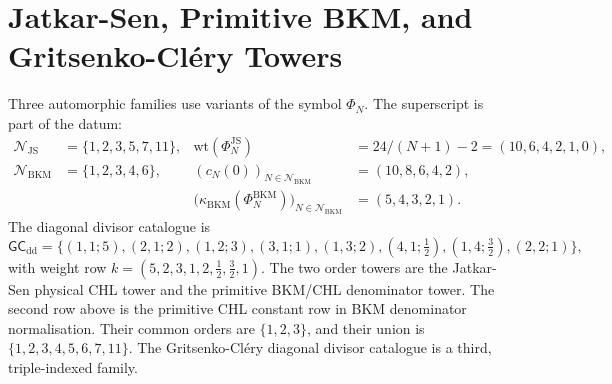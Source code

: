 \providecommand{\ZZ}{\mathbb{Z}}
\providecommand{\Aut}{\mathrm{Aut}}

\section*{Jatkar-Sen, Primitive BKM, and Gritsenko-Cl\'ery Towers}
\label{sec:two-tower-unification}

Three automorphic families use variants of the symbol $\Phi_N$.
The superscript is part of the datum:
\[
\begin{aligned}
\mathcal N_{\mathrm{JS}}&=\{1,2,3,5,7,11\},&
\mathrm{wt}(\Phi_N^{\mathrm{JS}})&=24/(N+1)-2
=(10,6,4,2,1,0),\\
\mathcal N_{\mathrm{BKM}}&=\{1,2,3,4,6\},&
(c_N(0))_{N\in\mathcal N_{\mathrm{BKM}}}&=(10,8,6,4,2),\\
&&\bigl(\kappa_{\mathrm{BKM}}(\Phi_N^{\mathrm{BKM}})\bigr)_{N\in\mathcal N_{\mathrm{BKM}}}
&=(5,4,3,2,1).
\end{aligned}
\]
The diagonal divisor catalogue is
\[
\mathsf{GC}_{\mathrm{dd}}=
\{(1,1;5),(2,1;2),(1,2;3),(3,1;1),(1,3;2),
(4,1;\tfrac12),(1,4;\tfrac32),(2,2;1)\},
\]
with weight row \(k=(5,2,3,1,2,\tfrac12,\tfrac32,1)\).
The two order towers are the Jatkar-Sen physical CHL tower and the
primitive BKM/CHL denominator tower. The second row above is the
primitive CHL constant row in BKM denominator normalisation. Their
common orders are \(\{1,2,3\}\), and their union is
\(\{1,2,3,4,5,6,7,11\}\).
The Gritsenko-Cl\'ery diagonal divisor catalogue is a third,
triple-indexed family.

